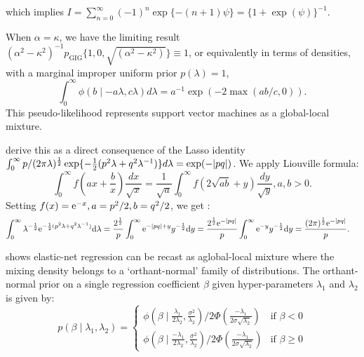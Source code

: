 \documentclass[lineno]{biometrika}
\begin{document}
which implies $I = \sum_{n=0}^{\infty} (-1)^n \exp\{-(n+1)\psi\} = \{1+\exp(\psi)\}^{-1}$. %
\begin{remark}
When $\alpha = \kappa$, we have the limiting result $(\alpha^2-\kappa^2)^{-1}p_{\mathrm{GIG}}\{ 1,0,\sqrt{(\alpha^2-\kappa^2)} \} \equiv 1$, or equivalently in terms of densities, with a marginal improper uniform prior $p(\lambda) = 1$,
\begin{equation}
  \int_{0}^{\infty} \phi(b \mid -a\lambda, c\lambda) d\lambda = a^{-1} \exp(-2 \max(ab/c,0)). \label{eq:svm}
\end{equation}
This pseudo-likelihood represents support vector machines as a global-local mixture. 
\end{remark}
\citet{polson2011data} derive this as a direct consequence of the Lasso identity $\int_0^{\infty} p/(2\pi \lambda)^{\frac{1}{2}} \exp\{-\frac{1}{2} (p^2 \lambda+q^2 \lambda^{-1})\} d\lambda = \exp(-|pq|)$. We apply Liouville formula:
$$
\int_{0}^{\infty} f\left(ax + \frac{b}{x} \right) \frac{dx}{\sqrt{x}} = \frac{1}{\sqrt{a}} \int_{0}^{\infty} f \left( 2\sqrt{ab} + y \right) \frac{dy}{\sqrt{y}}, a,b >0. 
$$
Setting $f(x) = {\rm e}^{-x}, a = p^2/2, b = q^2/2$, we get :
\begin{align*}
\int_0^{\infty} \lambda^{-\frac{1}{2}} {\rm e}^{-\frac{1}{2}(p^2 \lambda + q^2 \lambda^{-1})} {\rm d} \lambda &= \frac{2^{\frac{1}{2}}}{p} \int_0^{\infty} {\rm e}^{-|pq| + y} y^{-\frac{1}{2}} {\rm d} y =  \frac{2^{\frac{1}{2}} {\rm e}^{-|pq|}}{p} \int_0^{\infty} {\rm e}^{-y} y^{-\frac{1}{2}} {\rm d} y = \frac{(2\pi)^{\frac{1}{2}} {\rm e}^{-|pq|}}{p}.
\end{align*}

\citet{hans2011comment} shows elastic-net regression can be recast as aglobal-local mixture where the mixing density belongs to a `orthant-normal' family of distributions. The orthant-normal prior on a single regression coefficient $\beta$ given hyper-parameters $\lambda_1$ and $\lambda_2$ is given by: 
\[
p (\beta \mid \lambda_1, \lambda_2)  = 
  \begin{cases} 
   \phi(\beta \mid \frac{\lambda_1}{2\lambda_2}, \frac{\sigma^2}{\lambda_2}) / 2\Phi(\frac{-\lambda_1}{2\sigma\sqrt{\lambda_2}}) & \text{if } \beta < 0 \\
   \phi(\beta \mid \frac{-\lambda_1}{2\lambda_2}, \frac{\sigma^2}{\lambda_2}) / 2\Phi(\frac{-\lambda_1}{2\sigma\sqrt{\lambda_2}})       & \text{if } \beta \geq 0
  \end{cases} \label{eq:hans}
\]
\end{document}
